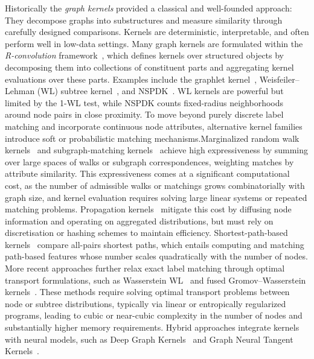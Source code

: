 Historically the \emph{graph kernels} provided a classical and well-founded approach: They decompose graphs into substructures and measure similarity through carefully
designed comparisons. Kernels are deterministic, interpretable, and often
perform well in low-data settings.
Many graph kernels are formulated within the \emph{R-convolution}
framework~\citep{haussler1999}, which defines kernels over structured objects by decomposing them into collections of constituent parts and aggregating kernel evaluations over these parts. Examples include the graphlet
kernel~\citep{shervashidze2009efficient}, Weisfeiler–Lehman (WL) subtree
kernel~\citep{shervashidze2011weisfeiler}, and NSPDK~\citep{costa2010fast}. WL
kernels are powerful but limited by the 1-WL test, while NSPDK counts
fixed-radius neighborhoods around node pairs in close proximity. To move beyond purely discrete label matching and incorporate continuous node attributes, alternative kernel families introduce soft or probabilistic matching mechanisms.Marginalized random walk kernels~\citep{kashima2003marginalized,gartner2003graph,vishwanathan2010graph} and subgraph-matching kernels~\citep{kriege2012subgraph} achieve high expressiveness by summing over large spaces of walks or subgraph correspondences, weighting matches by attribute similarity. This expressiveness comes at a significant computational cost, as the number of admissible walks or matchings grows combinatorially with graph size, and kernel evaluation requires solving large linear systems or repeated matching problems. Propagation kernels~\citep{neumann2016propagation} mitigate this cost by diffusing node information and operating on aggregated distributions, but must rely on discretisation or hashing schemes to maintain efficiency.
Shortest-path-based kernels~\citep{borgwardt2005shortest,feragen2013scalable} compare all-pairs shortest paths, which entails computing and matching path-based features whose number scales quadratically with the number of nodes. More recent approaches further relax exact label matching through optimal transport formulations, such as Wasserstein WL~\citep{togninalli2019wasserstein} and fused Gromov–Wasserstein kernels~\citep{vayer2019optimaltransportstructureddata}. These methods require solving optimal transport problems between node or subtree distributions, typically via linear or entropically regularized programs, leading to cubic or near-cubic complexity in the number of nodes and substantially higher memory requirements. Hybrid approaches integrate kernels with neural models, such as Deep Graph Kernels~\citep{yanardag2015deep} and Graph Neural Tangent
Kernels~\citep{du2019graphnt}. 

